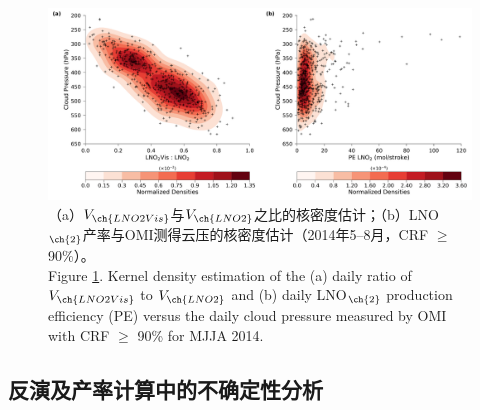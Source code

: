 \begin{figure}[H]
\centering
\includegraphics[width=\textwidth]{./figures/us_cp_ratio_lno2.png}
\caption{（a）$V_{\ch{LNO2Vis}}$与$V_{\ch{LNO2}}$之比的核密度估计；（b）LNO$_{\ch{2}}$产率与OMI测得云压的核密度估计（2014年5--8月，CRF $\geq$ 90\%）。\\
Figure \ref{fig:us_cp_ratio_lno2}. Kernel density estimation of the (a) daily ratio of $V_{\ch{LNO2Vis}}$ to $V_{\ch{LNO2}}$ and (b) daily LNO$_{\ch{2}}$ production efficiency (PE) versus the daily cloud pressure measured by OMI with CRF $\geq$ 90\% for MJJA 2014.}
\label{fig:us_cp_ratio_lno2}
\end{figure}




\subsection{反演及产率计算中的不确定性分析}


